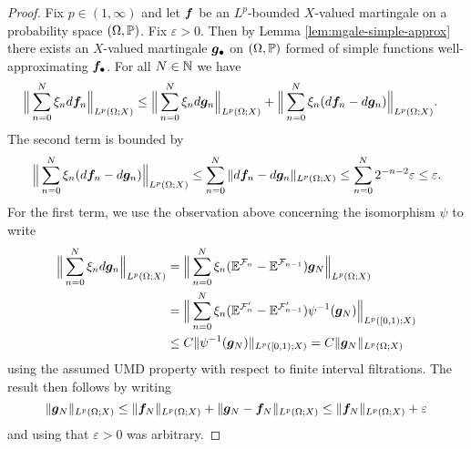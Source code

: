 \begin{proof}
  Fix $p \in (1,\infty)$ and let $\mb{f}$ be an $L^p$-bounded $X$-valued martingale on a probability space $(\Omega,\P)$.
  Fix $\varepsilon > 0$.
  Then by Lemma \ref{lem:mgale-simple-approx} there exists an $X$-valued martingale $\mb{g}_{\bullet}$ on $(\Omega,\P)$ formed of simple functions well-approximating $\mb{f}_{\bullet}$.
  For all $N \in \N$ we have
  \begin{equation*}
    \begin{aligned}
      \Big\| \sum_{n=0}^{N} \xi_{n} d\mb{f}_{n} \Big\|_{L^p(\Omega;X)}
      &\leq \Big\| \sum_{n=0}^{N} \xi_{n} d\mb{g}_{n} \Big\|_{L^p(\Omega;X)} + \Big\| \sum_{n=0}^{N} \xi_{n} (d\mb{f}_{n} - d\mb{g}_{n}) \Big\|_{L^p(\Omega;X)}.
    \end{aligned}
  \end{equation*}
  The second term is bounded by
  \begin{equation*}
    \Big\| \sum_{n=0}^{N} \xi_{n} (d\mb{f}_{n} - d\mb{g}_{n}) \Big\|_{L^p(\Omega;X)}
    \leq \sum_{n=0}^{N} \|d\mb{f}_{n} - d\mb{g}_{n}\|_{L^p(\Omega;X)} \leq \sum_{n=0}^{N}2^{-n-2}\varepsilon \leq \varepsilon.
  \end{equation*}
  For the first term, we use the observation above concerning the isomorphism $\psi$ to write
  \begin{equation*}
    \begin{aligned}
      \Big\| \sum_{n=0}^{N} \xi_{n} d\mb{g}_{n} \Big\|_{L^p(\Omega;X)}
      &= \Big\| \sum_{n=0}^{N} \xi_{n} (\E^{\mc{F}_{n}} - \E^{\mc{F}_{n-1}}) \mb{g}_{N} \Big\|_{L^p(\Omega;X)} \\
      &= \Big\| \sum_{n=0}^{N} \xi_{n} (\E^{\mc{F}'_{n}} - \E^{\mc{F}'_{n-1}}) \psi^{-1}(\mb{g}_{N}) \Big\|_{L^p([0,1);X)} \\
      &\leq C \| \psi^{-1}(\mb{g}_{N}) \|_{L^p([0,1);X)} 
      = C \|\mb{g}_{N}\|_{L^p(\Omega;X)}
    \end{aligned}
  \end{equation*}
  using the assumed UMD property with respect to finite interval filtrations.
  The result then follows by writing
  \begin{equation*}
    \|\mb{g}_{N}\|_{L^p(\Omega;X)} \leq \|\mb{f}_{N}\|_{L^p(\Omega;X)} + \|\mb{g}_{N} - \mb{f}_{N}\|_{L^p(\Omega;X)}
    \leq \|\mb{f}_{N}\|_{L^p(\Omega;X)} + \varepsilon
  \end{equation*}
  and using that $\varepsilon > 0$ was arbitrary.
\end{proof}

